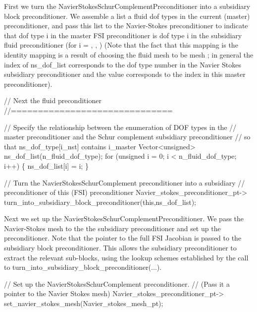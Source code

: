 \begin{DoxyEnumerate}
\item First we turn the {\ttfamily Navier\+Stokes\+Schur\+Complement\+Preconditioner} into a subsidiary block preconditioner. We assemble a list a fluid dof types in the current (master) preconditioner, and pass this list to the Navier-\/\+Stokes preconditioner to indicate that dof type {\ttfamily i} in the master F\+SI preconditioner is dof type {\ttfamily i} in the subsidiary fluid preconditioner (for {\ttfamily i} {\ttfamily =} {}, {}, {}) (Note that the fact that this mapping is the identity mapping is a result of choosing the fluid mesh to be mesh {}; in general the index of {\ttfamily ns\+\_\+dof\+\_\+list} corresponds to the dof type number in the Navier Stokes subsidiary preconditioner and the value corresponds to the index in this master preconditioner).  
\begin{DoxyCodeInclude}
 \textcolor{comment}{// Next the fluid preconditioner}
 \textcolor{comment}{//==============================}
 
 \textcolor{comment}{// Specify the relationship between the enumeration of DOF types in the }
 \textcolor{comment}{// master preconditioner and the Schur complement subsidiary preconditioner }
 \textcolor{comment}{// so that ns\_dof\_type[i\_nst] contains i\_master}
 Vector<unsigned> ns\_dof\_list(n\_fluid\_dof\_type);
 \textcolor{keywordflow}{for} (\textcolor{keywordtype}{unsigned} i = 0; i < n\_fluid\_dof\_type; i++)
  \{
   ns\_dof\_list[i] = i;
  \}
 
 \textcolor{comment}{// Turn the NavierStokesSchurComplement preconditioner into a subsidiary }
 \textcolor{comment}{// preconditioner of this (FSI) preconditioner}
 Navier\_stokes\_preconditioner\_pt->
  turn\_into\_subsidiary\_block\_preconditioner(\textcolor{keyword}{this},ns\_dof\_list);

\end{DoxyCodeInclude}

\item Next we set up the {\ttfamily Navier\+Stokes\+Schur\+Complement\+Preconditioner}. We pass the Navier-\/\+Stokes mesh to the the subsidiary preconditioner and set up the preconditioner. Note that the pointer to the full F\+SI Jacobian is passed to the subsidiary block preconditioner. This allows the subsidiary preconditioner to extract the relevant sub-\/blocks, using the lookup schemes established by the call to {\ttfamily turn\+\_\+into\+\_\+subsidiary\+\_\+block\+\_\+preconditioner}(...).  
\begin{DoxyCodeInclude}
 \textcolor{comment}{// Set up the NavierStokesSchurComplement preconditioner. }
 \textcolor{comment}{// (Pass it a pointer to the Navier Stokes mesh)}
 Navier\_stokes\_preconditioner\_pt->
  set\_navier\_stokes\_mesh(Navier\_stokes\_mesh\_pt);


\end{DoxyCodeInclude}
\end{DoxyEnumerate}
